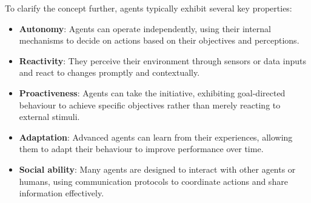 To clarify the concept further, agents typically exhibit several key properties:

\begin{itemize}
    \item \textbf{Autonomy}: Agents can operate independently, using their internal mechanisms to decide on actions based on their objectives and perceptions.
    \item \textbf{Reactivity}: They perceive their environment through sensors or data inputs and react to changes promptly and contextually.
    \item \textbf{Proactiveness}: Agents can take the initiative, exhibiting goal-directed behaviour to achieve specific objectives rather than merely reacting to external stimuli.
    \item \textbf{Adaptation}: Advanced agents can learn from their experiences, allowing them to adapt their behaviour to improve performance over time.
    \item \textbf{Social ability}: Many agents are designed to interact with other agents or humans, using communication protocols to coordinate actions and share information effectively.
\end{itemize}





